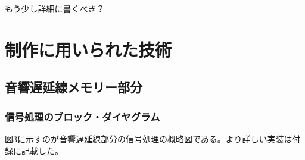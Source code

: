 \documentclass[a4paper,report]{jsbook}
\begin{document}
もう少し詳細に書くべき？

\section{制作に用いられた技術}\label{ux5236ux4f5cux306bux7528ux3044ux3089ux308cux305fux6280ux8853}

\subsection{音響遅延線メモリー部分}\label{ux97f3ux97ffux9045ux5ef6ux7ddaux30e1ux30e2ux30eaux30fcux90e8ux5206}

\subsubsection{信号処理のブロック・ダイヤグラム}\label{ux4fe1ux53f7ux51e6ux7406ux306eux30d6ux30edux30c3ux30afux30c0ux30a4ux30e4ux30b0ux30e9ux30e0}

図3に示すのが音響遅延線部分の信号処理の概略図である。より詳しい実装は付録に記載した。
\end{document}
